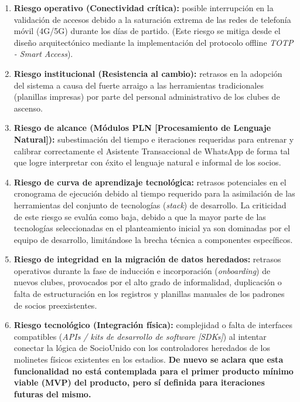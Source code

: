 \begin{enumerate}
    \item \textbf{Riesgo operativo (Conectividad crítica):} posible interrupción en la validación de accesos debido a la saturación extrema de las redes de telefonía móvil (4G/5G) durante los días de partido. (Este riesgo se mitiga desde el diseño arquitectónico mediante la implementación del protocolo offline \textit{TOTP - Smart Access}).
    \item \textbf{Riesgo institucional (Resistencia al cambio):} retrasos en la adopción del sistema a causa del fuerte arraigo a las herramientas tradicionales (planillas impresas) por parte del personal administrativo de los clubes de ascenso.
    \item \textbf{Riesgo de alcance (Módulos PLN [Procesamiento de Lenguaje Natural]):} subestimación del tiempo e iteraciones requeridas para entrenar y calibrar correctamente el Asistente Transaccional de WhatsApp de forma tal que logre interpretar con éxito el lenguaje natural e informal de los socios.
    \item \textbf{Riesgo de curva de aprendizaje tecnológica:} retrasos potenciales en el cronograma de ejecución debido al tiempo requerido para la asimilación de las herramientas del conjunto de tecnologías (\textit{stack}) de desarrollo. La criticidad de este riesgo se evalúa como baja, debido a que la mayor parte de las tecnologías seleccionadas en el planteamiento inicial ya son dominadas por el equipo de desarrollo, limitándose la brecha técnica a componentes específicos.
    \item \textbf{Riesgo de integridad en la migración de datos heredados:} retrasos operativos durante la fase de inducción e incorporación (\textit{onboarding}) de nuevos clubes, provocados por el alto grado de informalidad, duplicación o falta de estructuración en los registros y planillas manuales de los padrones de socios preexistentes.
    \item \textbf{Riesgo tecnológico (Integración física):} complejidad o falta de interfaces compatibles (\textit{APIs / kits de desarrollo de software [SDKs]}) al intentar conectar la lógica de SocioUnido con los controladores heredados de los molinetes físicos existentes en los estadios. \textbf{De nuevo se aclara que esta funcionalidad no está contemplada para el primer producto mínimo viable (MVP) del producto, pero sí definida para iteraciones futuras del mismo.}
\end{enumerate}
